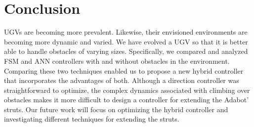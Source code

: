 \section{Conclusion}
\label{sec:conclusion}

UGVs are becoming more prevalent. Likewise, their envisioned environments are becoming more dynamic and varied.
%
We have evolved a UGV so that it is better able to handle obstacles of varying sizes.
%
Specifically, we compared and analyzed FSM and ANN controllers with and without obstacles in the environment.
%
Comparing these two techniques enabled us to propose a new hybrid controller that incorporates the advantages of both.
%
Although a direction controller was straightforward to optimize, the complex dynamics associated with climbing over obstacles makes it more difficult to design a controller for extending the Adabot' struts.
%
Our future work will focus on optimizing the hybrid controller and investigating different techniques for extending the struts.




